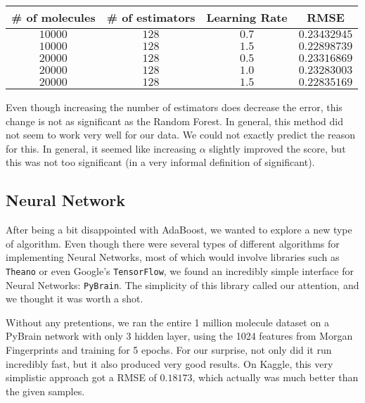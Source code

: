 \documentclass[10pt]{article}
\begin{document}
\medskip

\begin{center}

\begin{tabular}[center]{|c|c|c|c|}
\hline
\# of molecules & \# of estimators & Learning Rate &  RMSE \\
\hline
$10000$ & $128$ & $0.7$ & $0.23432945$ \\
\hline 
$10000$ & $128$ & $1.5$ & $0.22898739$ \\
\hline 
$20000$ & $128$ & $0.5$  & $0.23316869$ \\
\hline 
$20000$ & $128$ & $1.0$ & $0.23283003$ \\
\hline
$20000$ & $128$ & $1.5$ & $0.22835169$ \\
\hline
\end{tabular}

\end{center}

\medskip

Even though increasing the number of estimators does decrease the error, this
change is not as significant as the Random Forest. In general, this method 
did not seem to work very well for our data. We could not exactly predict
the reason for this. In general, it seemed like increasing $\alpha$ slightly
improved the score, but this was not too significant (in a very informal
definition of significant).

\subsection{Neural Network}

After being a bit disappointed with AdaBoost, we wanted to explore a new
type of algorithm. Even though there were several types of different algorithms
for implementing Neural Networks, most of which would involve libraries such
as \verb|Theano| or even Google's \verb|TensorFlow|, we found an incredibly simple interface
for Neural Networks: \verb|PyBrain|. The simplicity of this library called our attention, and
we thought it was worth a shot. 

\medskip

Without any pretentions, we ran the entire 1 million molecule dataset on a 
PyBrain network with only $3$ hidden layer, using the 1024 features from
Morgan Fingerprints and training for 5 epochs. For our surprise, not only did it run incredibly fast,
but it also produced very good results. On Kaggle, this very simplistic approach
got a RMSE of $0.18173$, which actually was much better than the given samples.
\end{document}
